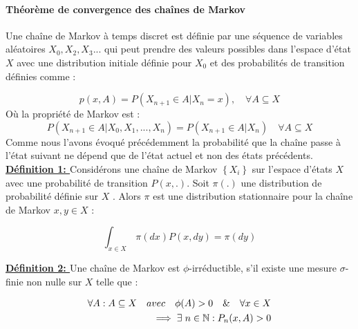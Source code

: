 \paragraph{Théorème de convergence des chaînes de Markov \cite{entezari2018bayesian} \cite{meyn2012markov} \cite{rosenthal2006first}}
Une chaîne de Markov à temps discret est définie par une séquence de variables aléatoires \(\displaystyle X_{0}, X_{2}, X_{3} ... \) qui peut prendre des valeurs possibles dans l'espace d'état \(\displaystyle X \) avec une distribution initiale définie pour \(\displaystyle X_{0}\) et des probabilités de transition définies comme :

\begin{equation}
	p(x,A) = P(X_{n+1} \in A | X_{n} = x), \hspace{1em} \forall A \subseteq X
\end{equation}
Où la propriété de Markov est :
\begin{equation}
	P(X_{n+1} \in A | X_{0},X_{1},...,X_{n}) = P(X_{n+1} \in A | X_{n})  \hspace{1em} \forall A \subseteq X
\end{equation}
Comme nous l’avons évoqué précédemment la probabilité que la chaîne passe à l'état suivant ne dépend que de l'état actuel et non des états précédents. \\
\textbf{\underline{Définition 1: }} Considérons une chaîne de Markov \(\displaystyle \left\{ X_{i} \right\} \) sur l'espace d'états \(\displaystyle X \) avec une probabilité de transition \(\displaystyle P(x,.) \). Soit \(\displaystyle \pi (.) \) une distribution de probabilité définie sur \(\displaystyle X \) . Alors \(\displaystyle \pi \) est une distribution stationnaire pour la chaîne de Markov  \(\displaystyle x,y \in X \) :

\begin{equation}
	\int_{x \in X}^{}  \,\pi(dx)P(x,dy) = \pi(dy)
\end{equation}

\noindent \textbf{\underline{Définition 2: }} Une chaîne de Markov est \(\displaystyle \phi \)-irréductible, s'il existe une mesure \(\displaystyle \sigma\)-finie non nulle sur \(\displaystyle X \) telle que :

\begin{equation}
	\begin{split}
	\forall A :  A \subseteq X \hspace{1em} avec \hspace{1em} \phi(A) > 0  \hspace{1em} \&  \hspace{1em} \forall x \in X \\
	\implies \exists \hspace{0.3em} n \in \mathbb{N} : P_{n}(x,A) > 0
	\end{split}
\end{equation}

